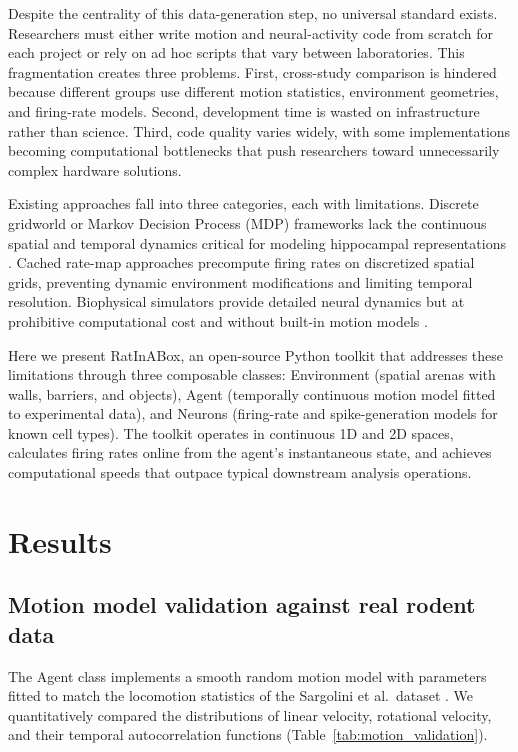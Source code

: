 \documentclass[11pt]{article}
\begin{document}
Despite the centrality of this data-generation step, no universal standard exists. Researchers must either write motion and neural-activity code from scratch for each project or rely on ad hoc scripts that vary between laboratories. This fragmentation creates three problems. First, cross-study comparison is hindered because different groups use different motion statistics, environment geometries, and firing-rate models. Second, development time is wasted on infrastructure rather than science. Third, code quality varies widely, with some implementations becoming computational bottlenecks that push researchers toward unnecessarily complex hardware solutions.

Existing approaches fall into three categories, each with limitations. Discrete gridworld or Markov Decision Process (MDP) frameworks lack the continuous spatial and temporal dynamics critical for modeling hippocampal representations \citep{stachenfeld2017hippocampus}. Cached rate-map approaches precompute firing rates on discretized spatial grids, preventing dynamic environment modifications and limiting temporal resolution. Biophysical simulators provide detailed neural dynamics but at prohibitive computational cost and without built-in motion models \citep{dayan2005theoretical}.

Here we present RatInABox, an open-source Python toolkit that addresses these limitations through three composable classes: Environment (spatial arenas with walls, barriers, and objects), Agent (temporally continuous motion model fitted to experimental data), and Neurons (firing-rate and spike-generation models for known cell types). The toolkit operates in continuous 1D and 2D spaces, calculates firing rates online from the agent's instantaneous state, and achieves computational speeds that outpace typical downstream analysis operations.

\section{Results}

\subsection{Motion model validation against real rodent data}

The Agent class implements a smooth random motion model with parameters fitted to match the locomotion statistics of the Sargolini et al.\ dataset \citep{sargolini2006conjunctive}. We quantitatively compared the distributions of linear velocity, rotational velocity, and their temporal autocorrelation functions (Table~\ref{tab:motion_validation}).
\end{document}
